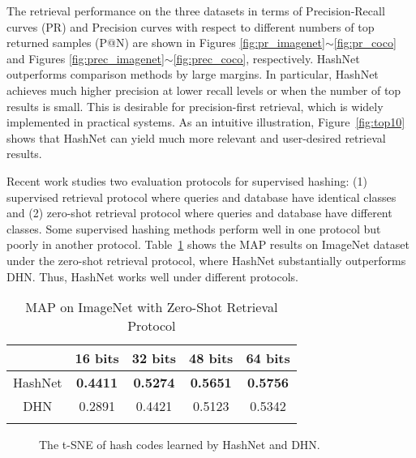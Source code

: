 \documentclass[10pt,twocolumn,letterpaper]{article}
\begin{document}
The retrieval performance on the three datasets in terms of Precision-Recall curves (PR) and Precision curves with respect to different numbers of top returned samples (P@N) are shown in Figures \ref{fig:pr_imagenet}$\sim$\ref{fig:pr_coco} and Figures \ref{fig:prec_imagenet}$\sim$\ref{fig:prec_coco}, respectively. HashNet outperforms comparison methods by large margins. In particular, HashNet achieves much higher precision at lower recall levels or when the number of top results is small. This is desirable for precision-first retrieval, which is widely implemented in practical systems. As an intuitive illustration, Figure~\ref{fig:top10} shows that HashNet can yield much more relevant and user-desired retrieval results. 

Recent work \cite{cite:TIP17HSL} studies two evaluation protocols for supervised hashing: (1) supervised retrieval protocol where queries and database have identical classes and (2) zero-shot retrieval protocol where queries and database have different classes. Some supervised hashing methods perform well in one protocol but poorly in another protocol. Table~\ref{table:zeroshot} shows the MAP results on ImageNet dataset under the zero-shot retrieval protocol, where HashNet substantially outperforms DHN. Thus, HashNet works well under different protocols.

\begin{table}[!tbp]
    \centering
    \addtolength{\tabcolsep}{3pt}
    \caption{MAP on ImageNet with Zero-Shot Retrieval Protocol \cite{cite:TIP17HSL}}
    \label{table:zeroshot}
    \begin{tabular}{c|cccc}
        \Xhline{1.0pt}{\centering Method} & 16 bits & 32 bits  & 48 bits  & 64 bits \\
        \hline
        HashNet & \textbf{0.4411} & \textbf{0.5274} & \textbf{0.5651} & \textbf{0.5756} \\
        DHN \cite{cite:AAAI16DHN} & 0.2891 & 0.4421 & 0.5123 & 0.5342  \\
        \Xhline{1.0pt}
    \end{tabular}
    \vspace{-10pt}
\end{table}

\begin{figure}[!tbp]
    \centering
    \hspace{10pt}
    \caption{The t-SNE of hash codes learned by HashNet and DHN.}
    \label{fig:t-sne}
    \vspace{-10pt}
\end{figure}
\end{document}

